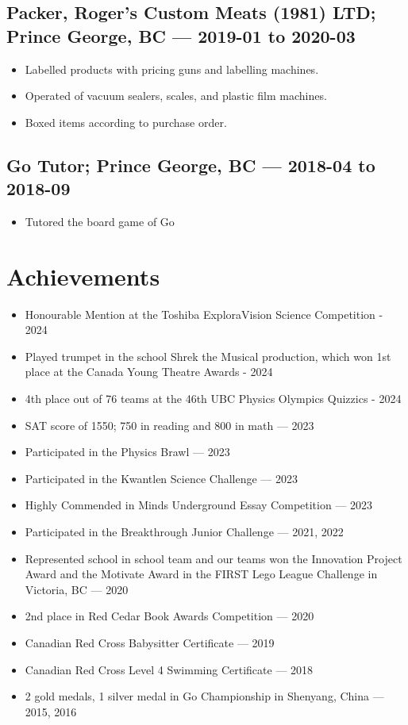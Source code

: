 \documentclass{article}
\begin{document}
\subsection*{Packer, Roger's Custom Meats (1981) LTD; Prince George, BC — 2019-01 to 2020-03}

\begin{itemize}
    \item Labelled products with pricing guns and labelling machines.
    \item Operated of vacuum sealers, scales, and plastic film machines.
    \item Boxed items according to purchase order.
\end{itemize}

\subsection*{Go Tutor; Prince George, BC — 2018-04 to 2018-09}

\begin{itemize}
    \item Tutored the board game of Go
\end{itemize}

\section*{Achievements}

\begin{itemize}
    \item Honourable Mention at the Toshiba ExploraVision Science Competition - 2024
    \item Played trumpet in the school Shrek the Musical production, which won 1st place at the Canada Young Theatre Awards - 2024
    \item 4th place out of 76 teams at the 46th UBC Physics Olympics Quizzics - 2024
    \item SAT score of 1550; 750 in reading and 800 in math — 2023
    \item Participated in the Physics Brawl — 2023
    \item Participated in the Kwantlen Science Challenge — 2023
    \item Highly Commended in Minds Underground Essay Competition — 2023
    \item Participated in the Breakthrough Junior Challenge — 2021, 2022
    \item Represented school in school team and our teams won the Innovation Project Award and the Motivate Award in the FIRST Lego League Challenge in Victoria, BC — 2020
    \item 2nd place in Red Cedar Book Awards Competition — 2020
    \item Canadian Red Cross Babysitter Certificate — 2019
    \item Canadian Red Cross Level 4 Swimming Certificate — 2018
    \item 2 gold medals, 1 silver medal in Go Championship in Shenyang, China — 2015, 2016
\end{itemize}
\end{document}
